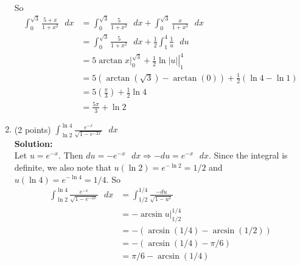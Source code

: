 \documentclass[paper=a4, fontsize=11pt]{scrartcl} %
\numberwithin{equation}{section} %
\numberwithin{figure}{section} %
\numberwithin{table}{section} %
\begin{document}
\begin{enumerate}
So
\begin{align*}
\int_0^{\sqrt{3}} \frac{5+x}{1+x^2} \text{ } dx &= \int_0^{\sqrt{3}} \frac{5}{1+x^2} \text{ } dx + \int_0^{\sqrt{3}} \frac{x}{1+x^2} \text{ } dx\\
&= \int_0^{\sqrt{3}} \frac{5}{1+x^2} \text{ } dx + \frac{1}{2}\int_1^4  \frac{1}{u}\text{ } du\\
&=  \left.5\arctan x\right|_0^{\sqrt{3}} + \left.\frac{1}{2}\ln|u|\right|_1^4\\
&= 5(\arctan(\sqrt{3}) - \arctan(0)) +  \frac{1}{2}(\ln 4 - \ln 1)\\
&= 5\left(\frac{\pi}{3}\right) +  \frac{1}{2}\ln 4\\
&= \boxed{\frac{5\pi}{3} + \ln 2}
\end{align*}

\item (2 points) $\displaystyle \int_{\ln 2}^{\ln 4} \frac{e^{-x}}{\sqrt{1-e^{-2x}}} \text{ } dx$\\
\noindent\textbf{Solution:}\\
Let $u = e^{-x}$.  Then $du = -e^{-x}\text{ }dx \Longrightarrow -du = e^{-x}\text{ } dx$.  Since the integral is definite, we also note that $u(\ln 2) = e^{-\ln 2} = 1/2$ and $u(\ln 4) = e^{-\ln 4} = 1/4$.  So
\begin{align*}
\int_{\ln 2}^{\ln 4} \frac{e^{-x}}{\sqrt{1-e^{-2x}}} \text{ } dx &=
\int_{1/2}^{1/4} \frac{-du}{\sqrt{1-u^2}}\\
&= -\arcsin u|_{1/2}^{1/4}\\
&=-(\arcsin(1/4) - \arcsin(1/2))\\
&= -(\arcsin(1/4) - \pi/6)\\
&=\boxed{ \pi/6 - \arcsin(1/4) }
\end{align*}

\end{enumerate}

\end{document}
